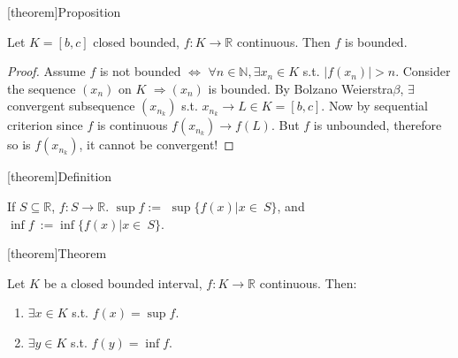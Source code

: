 \documentclass[12pt]{report}
\theoremstyle{definition}
\begin{document}
[theorem]{Proposition}
\begin{sequence is bounded in closed bounded continuous func}
    Let $K = [b,c]$ closed bounded, $f:K\rightarrow{}\mathbb{R}$ continuous.
    Then $f$ is bounded.
\end{sequence is bounded in closed bounded continuous func}

\begin{proof}
    Assume $f$ is not bounded $\iff$
    $\forall n \in \mathbb{N}, \exists x_n \in K$ s.t. $|f(x_n)|>n$.
    Consider the sequence $(x_n)$ on $K$ $\Rightarrow{}(x_n)$ is bounded.
    By Bolzano Weierstra$\beta$, $\exists$ convergent subsequence $(x_{n_k})$
    s.t. $x_{n_k} \rightarrow{} L \in K = [b,c]$.
    Now by sequential criterion since $f$ is continuous $f(x_{n_k}) \rightarrow{}f(L)$.
    But $f$ is unbounded, therefore so is $f(x_{n_k})$, it cannot be convergent!
\end{proof}

[theorem]{Definition}
\begin{supremum of function}
    If $S \subseteq \mathbb{R}$, $f:S\rightarrow{}\mathbb{R}$.
    $\sup{f} :=$ $ \sup{\{f(x) | x \in\ S\}}$,
    and $\inf{f}\ := \inf{\{ f(x) | x \in\ S\}}$.
\end{supremum of function}

[theorem]{Theorem}
\begin{closed bounded interval func has sup}
    Let $K$ be a closed bounded interval, $f:K\rightarrow{}\mathbb{R}$ continuous. Then:
    \begin{enumerate}[label = (\arabic*)]
        \item $\exists x \in K$ s.t. $f(x) = \sup{f}$.
        \item $\exists y \in K$ s.t. $f(y) = \inf{f}$.
    \end{enumerate}
    
\end{closed bounded interval func has sup}
\end{document}
